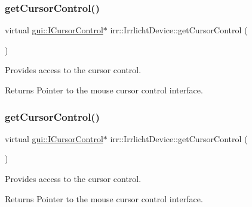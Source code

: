 \subsubsection{\texorpdfstring{get\+Cursor\+Control()}{getCursorControl()}\hspace{0.1cm}{\footnotesize\ttfamily [1/2]}}
{\footnotesize\ttfamily virtual \hyperlink{classirr_1_1gui_1_1ICursorControl}{gui\+::\+I\+Cursor\+Control}$\ast$ irr\+::\+Irrlicht\+Device\+::get\+Cursor\+Control (\begin{DoxyParamCaption}{ }\end{DoxyParamCaption})\hspace{0.3cm}{\ttfamily [pure virtual]}}



Provides access to the cursor control. 

\begin{DoxyReturn}{Returns}
Pointer to the mouse cursor control interface. 
\end{DoxyReturn}
\mbox{\label{classirr_1_1IrrlichtDevice_a500a3b7bf69487ff7e2075dd0b0db529}} 
\subsubsection{\texorpdfstring{get\+Cursor\+Control()}{getCursorControl()}\hspace{0.1cm}{\footnotesize\ttfamily [2/2]}}
{\footnotesize\ttfamily virtual \hyperlink{classirr_1_1gui_1_1ICursorControl}{gui\+::\+I\+Cursor\+Control}$\ast$ irr\+::\+Irrlicht\+Device\+::get\+Cursor\+Control (\begin{DoxyParamCaption}{ }\end{DoxyParamCaption})\hspace{0.3cm}{\ttfamily [pure virtual]}}



Provides access to the cursor control. 

\begin{DoxyReturn}{Returns}
Pointer to the mouse cursor control interface. 
\end{DoxyReturn}
\mbox{\label{classirr_1_1IrrlichtDevice_a26227e20e46915942d067532c61df42b}} 
